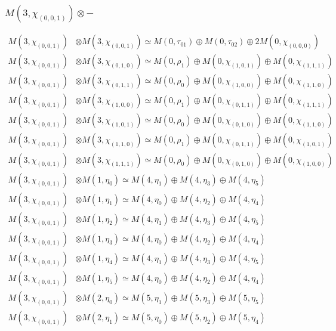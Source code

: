 \subsubsection{$ M(3,\chi_{(0,0,1)})\otimes -$}
\begin{align*}
M(3,\chi_{(0,0,1)}) &\otimes M(3,\chi_{(0,0,1)}) \simeq M(0,\tau_{01}) \oplus M(0,\tau_{02}) \oplus 2 M(0,\chi_{(0,0,0)}) \\
M(3,\chi_{(0,0,1)}) &\otimes M(3,\chi_{(0,1,0)}) \simeq M(0,\rho_{1}) \oplus M(0,\chi_{(1,0,1)}) \oplus M(0,\chi_{(1,1,1)}) \\
M(3,\chi_{(0,0,1)}) &\otimes M(3,\chi_{(0,1,1)}) \simeq M(0,\rho_{0}) \oplus M(0,\chi_{(1,0,0)}) \oplus M(0,\chi_{(1,1,0)}) \\
M(3,\chi_{(0,0,1)}) &\otimes M(3,\chi_{(1,0,0)}) \simeq M(0,\rho_{1}) \oplus M(0,\chi_{(0,1,1)}) \oplus M(0,\chi_{(1,1,1)}) \\
M(3,\chi_{(0,0,1)}) &\otimes M(3,\chi_{(1,0,1)}) \simeq M(0,\rho_{0}) \oplus M(0,\chi_{(0,1,0)}) \oplus M(0,\chi_{(1,1,0)}) \\
M(3,\chi_{(0,0,1)}) &\otimes M(3,\chi_{(1,1,0)}) \simeq M(0,\rho_{1}) \oplus M(0,\chi_{(0,1,1)}) \oplus M(0,\chi_{(1,0,1)}) \\
M(3,\chi_{(0,0,1)}) &\otimes M(3,\chi_{(1,1,1)}) \simeq M(0,\rho_{0}) \oplus M(0,\chi_{(0,1,0)}) \oplus M(0,\chi_{(1,0,0)}) \\
M(3,\chi_{(0,0,1)}) &\otimes M(1,\eta_{0}) \simeq M(4,\eta_{1}) \oplus M(4,\eta_{3}) \oplus M(4,\eta_{5}) \\
M(3,\chi_{(0,0,1)}) &\otimes M(1,\eta_{1}) \simeq M(4,\eta_{0}) \oplus M(4,\eta_{2}) \oplus M(4,\eta_{4}) \\
M(3,\chi_{(0,0,1)}) &\otimes M(1,\eta_{2}) \simeq M(4,\eta_{1}) \oplus M(4,\eta_{3}) \oplus M(4,\eta_{5}) \\
M(3,\chi_{(0,0,1)}) &\otimes M(1,\eta_{3}) \simeq M(4,\eta_{0}) \oplus M(4,\eta_{2}) \oplus M(4,\eta_{4}) \\
M(3,\chi_{(0,0,1)}) &\otimes M(1,\eta_{4}) \simeq M(4,\eta_{1}) \oplus M(4,\eta_{3}) \oplus M(4,\eta_{5}) \\
M(3,\chi_{(0,0,1)}) &\otimes M(1,\eta_{5}) \simeq M(4,\eta_{0}) \oplus M(4,\eta_{2}) \oplus M(4,\eta_{4}) \\
M(3,\chi_{(0,0,1)}) &\otimes M(2,\eta_{0}) \simeq M(5,\eta_{1}) \oplus M(5,\eta_{3}) \oplus M(5,\eta_{5}) \\
M(3,\chi_{(0,0,1)}) &\otimes M(2,\eta_{1}) \simeq M(5,\eta_{0}) \oplus M(5,\eta_{2}) \oplus M(5,\eta_{4}) \\

\end{align*}
